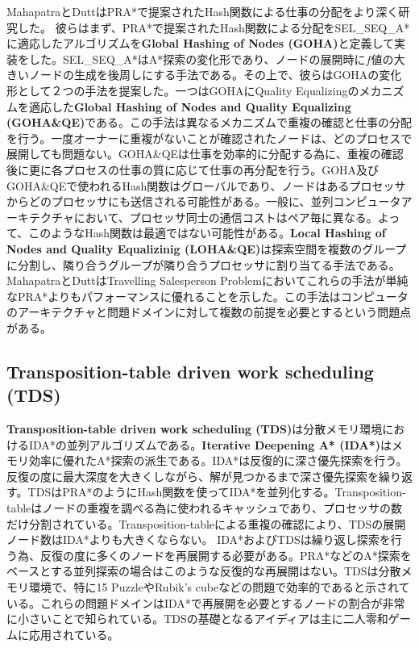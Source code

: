 \documentclass[uplatex]{jsarticle}
\begin{document}

MahapatraとDuttはPRA*で提案されたHash関数による仕事の分配をより深く研究した\cite{mahapatra1997scalable}。
彼らはまず、PRA*で提案されたHash関数による分配をSEL\_SEQ\_A*に適応したアルゴリズムを\textbf{Global Hashing of Nodes (GOHA)}と定義して実装をした。SEL\_SEQ\_A*はA*探索の変化形であり、ノードの展開時に$f$値の大きいノードの生成を後周しにする手法である。その上で、彼らはGOHAの変化形として２つの手法を提案した。一つはGOHAにQuality Equalizingのメカニズムを適応した\textbf{Global Hashing of Nodes and Quality Equalizing (GOHA\&QE)}である。この手法は異なるメカニズムで重複の確認と仕事の分配を行う。一度オーナーに重複がないことが確認されたノードは、どのプロセスで展開しても問題ない。GOHA\&QEは仕事を効率的に分配する為に、重複の確認後に更に各プロセスの仕事の質に応じて仕事の再分配を行う。GOHA及びGOHA\&QEで使われるHash関数はグローバルであり、ノードはあるプロセッサからどのプロセッサにも送信される可能性がある。一般に、並列コンピュータアーキテクチャにおいて、プロセッサ同士の通信コストはペア毎に異なる。よって、このようなHash関数は最適ではない可能性がある。\textbf{Local Hashing of Nodes and Quality Equalizinig (LOHA\&QE)}は探索空間を複数のグループに分割し、隣り合うグループが隣り合うプロセッサに割り当てる手法である。MahapatraとDuttはTravelling Salesperson Problemにおいてこれらの手法が単純なPRA*よりもパフォーマンスに優れることを示した。この手法はコンピュータのアーキテクチャと問題ドメインに対して複数の前提を必要とするという問題点がある。

\subsection{Transposition-table driven work scheduling (TDS)}
\textbf{Transposition-table driven work scheduling (TDS)}は分散メモリ環境におけるIDA*の並列アルゴリズムである\cite{romein1999transposition}。\textbf{Iterative Deepening A* (IDA*)}はメモリ効率に優れたA*探索の派生である\cite{Korf1985depth}。IDA*は反復的に深さ優先探索を行う。反復の度に最大深度を大きくしながら、解が見つかるまで深さ優先探索を繰り返す。TDSはPRA*のようにHash関数を使ってIDA*を並列化する。Transposition-tableはノードの重複を調べる為に使われるキャッシュであり、プロセッサの数だけ分割されている。Transposition-tableによる重複の確認により、TDSの展開ノード数はIDA*よりも大きくならない。
IDA*およびTDSは繰り返し探索を行う為、反復の度に多くのノードを再展開する必要がある。PRA*などのA*探索をベースとする並列探索の場合はこのような反復的な再展開はない。TDSは分散メモリ環境で、特に15 PuzzleやRubik's cubeなどの問題で効率的であると示されている。これらの問題ドメインはIDA*で再展開を必要とするノードの割合が非常に小さいことで知られている。TDSの基礎となるアイディアは主に二人零和ゲームに応用されている。
\end{document}
